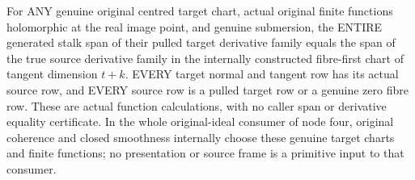 \begin{lemma}
\label{hir:submersion-relative-differential-original-finite-rows}
\leanok
For ANY genuine original centred target chart, actual original finite
functions holomorphic at the real image point, and genuine submersion, the
ENTIRE generated stalk span of their pulled target derivative family equals
the span of the true source derivative family in the internally constructed
fibre-first chart of tangent dimension $t+k$. EVERY target normal and tangent
row has its actual source row, and EVERY source row is a pulled target row or
a genuine zero fibre row. These are actual function calculations, with no
caller span or derivative equality certificate. In the whole original-ideal
consumer of node four, original coherence and closed smoothness internally
choose these genuine target charts and finite functions; no presentation or
source frame is a primitive input to that consumer.
\end{lemma}
